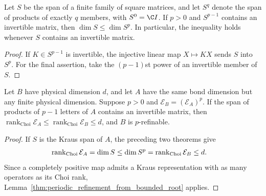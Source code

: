 \begin{lemma}
    \label{thm:periodic_root_word_span_dimension}
    \leanok
    Let $S$ be the span of a finite family of square matrices, and let
    $S^q$ denote the span of products of exactly $q$ members, with
    $S^0=\C I$. If $p>0$ and $S^{p-1}$ contains an invertible matrix,
    then $\dim S\le\dim S^p$. In particular, the inequality holds
    whenever $S$ contains an invertible matrix.
\end{lemma}

\begin{proof}\leanok
    If $K\in S^{p-1}$ is invertible, the injective linear map
    $X\mapsto KX$ sends $S$ into $S^p$. For the final assertion,
    take the $(p-1)$st power of an invertible member of $S$.
\end{proof}

\begin{lemma}
    \label{thm:periodic_refinement_invertible_root_word_span}
    \leanok
    Let $B$ have physical dimension $d$, and let $A$ have the same
    bond dimension but any finite physical dimension. Suppose $p>0$
    and $\mathcal E_B=(\mathcal E_A)^p$. If the span of products of
    $p-1$ letters of $A$ contains an invertible matrix, then
    $\operatorname{rank}_{\mathrm{Choi}}\mathcal E_A\le
        \operatorname{rank}_{\mathrm{Choi}}\mathcal E_B\le d$,
    and $B$ is $p$-refinable.
\end{lemma}

\begin{proof}\leanok
    If $S$ is the Kraus span of $A$, the preceding two theorems give
    \begin{align}
        \operatorname{rank}_{\mathrm{Choi}}\mathcal E_A
         & =\dim S\le\dim S^p
        =\operatorname{rank}_{\mathrm{Choi}}\mathcal E_B\le d.
        \notag
    \end{align}
    Since a completely positive map admits a Kraus representation with as many
    operators as its Choi rank,
    Lemma~\ref{thm:periodic_refinement_from_bounded_root} applies.
\end{proof}

